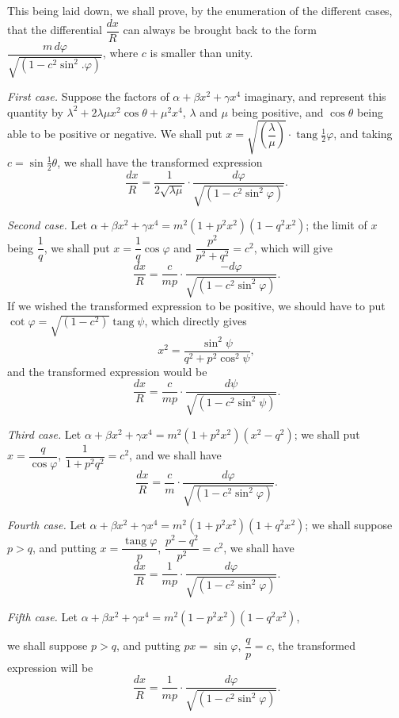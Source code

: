 \documentclass{article}
\begin{document}

This being laid down, we shall prove, by the enumeration of the different cases, that the differential $\dfrac{dx}{R}$ can always be brought back to the form $\dfrac{m\,d\varphi}{\sqrt{(1-c^{2}\sin^{2}.\varphi)}}$, where $c$ is smaller than unity.

\emph{First case.} Suppose the factors of $\alpha+\beta x^{2}+\gamma x^{4}$ imaginary, and represent this quantity by $\lambda^{2}+2\lambda\mu x^{2}\cos\theta+\mu^{2}x^{4}$, $\lambda$ and $\mu$ being positive, and $\cos\theta$ being able to be positive or negative. We shall put $x=\sqrt{\left(\dfrac{\lambda}{\mu}\right)}\cdot\operatorname{tang}\tfrac{1}{2}\varphi$, and taking $c=\sin\tfrac{1}{2}\theta$, we shall have the transformed expression
\[ \frac{dx}{R}=\frac{1}{2\sqrt{\lambda\mu}}\cdot\frac{d\varphi}{\sqrt{(1-c^{2}\sin^{2}\varphi)}}. \]

\emph{Second case.} Let $\alpha+\beta x^{2}+\gamma x^{4}=m^{2}(1+p^{2}x^{2})(1-q^{2}x^{2})$; the limit of $x$ being $\dfrac{1}{q}$, we shall put $x=\dfrac{1}{q}\cos\varphi$ and $\dfrac{p^{2}}{p^{2}+q^{2}}=c^{2}$, which will give
\[ \frac{dx}{R}=\frac{c}{mp}\cdot\frac{-d\varphi}{\sqrt{(1-c^{2}\sin^{2}\varphi)}}. \]
If we wished the transformed expression to be positive, we should have to put $\cot\varphi=\sqrt{(1-c^{2})}\operatorname{tang}\psi$, which directly gives
\[ x^{2}=\frac{\sin^{2}\psi}{q^{2}+p^{2}\cos^{2}\psi}, \]
and the transformed expression would be
\[ \frac{dx}{R}=\frac{c}{mp}\cdot\frac{d\psi}{\sqrt{(1-c^{2}\sin^{2}\psi)}}. \]

\emph{Third case.} Let $\alpha+\beta x^{2}+\gamma x^{4}=m^{2}(1+p^{2}x^{2})(x^{2}-q^{2})$; we shall put $x=\dfrac{q}{\cos\varphi}$, $\dfrac{1}{1+p^{2}q^{2}}=c^{2}$, and we shall have
\[ \frac{dx}{R}=\frac{c}{m}\cdot\frac{d\varphi}{\sqrt{(1-c^{2}\sin^{2}\varphi)}}. \]

\emph{Fourth case.} Let $\alpha+\beta x^{2}+\gamma x^{4}=m^{2}(1+p^{2}x^{2})(1+q^{2}x^{2})$; we shall suppose $p>q$, and putting $x=\dfrac{\operatorname{tang}\varphi}{p}$, $\dfrac{p^{2}-q^{2}}{p^{2}}=c^{2}$, we shall have
\[ \frac{dx}{R}=\frac{1}{mp}\cdot\frac{d\varphi}{\sqrt{(1-c^{2}\sin^{2}\varphi)}}. \]

\emph{Fifth case.} Let $\alpha+\beta x^{2}+\gamma x^{4}=m^{2}(1-p^{2}x^{2})(1-q^{2}x^{2})$,

we shall suppose $p>q$, and putting $px=\sin\varphi$, $\dfrac{q}{p}=c$, the transformed expression will be
\[ \frac{dx}{R}=\frac{1}{mp}\cdot\frac{d\varphi}{\sqrt{(1-c^{2}\sin^{2}\varphi)}}. \]
\end{document}
